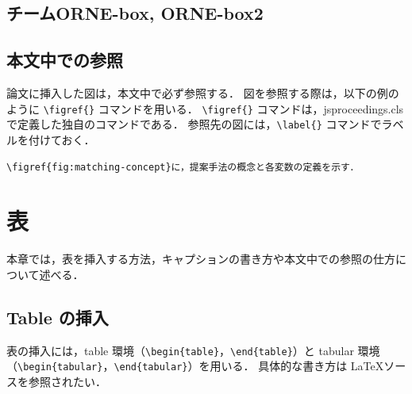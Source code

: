 \documentclass[uplatex, twocolumn, 9pt]{jsproceedings}
\begin{document}
\subsection{チームORNE-box, ORNE-box2}


\subsection{本文中での参照}
論文に挿入した図は，本文中で必ず参照する．
図を参照する際は，以下の例のように \verb*|\figref{}| コマンドを用いる．
\verb*|\figref{}| コマンドは，jsproceedings.cls で定義した独自のコマンドである．
参照先の図には，\verb*|\label{}| コマンドでラベルを付けておく．
\begin{description}[style=nextline]
  \item[\LaTeX ソース]%
  \verb|\figref{fig:matching-concept}に，提案手法の概念と各変数の定義を示す．|
  \item[出力]%
\end{description}


\section{表}
本章では，表を挿入する方法，キャプションの書き方や本文中での参照の仕方について述べる．

\subsection{Table の挿入}
表の挿入には，table 環境（\verb*|\begin{table}|，\verb*|\end{table}|）と tabular 環境（\verb*|\begin{tabular}|，\verb*|\end{tabular}|）を用いる．
具体的な書き方は \LaTeX ソースを参照されたい．

\end{document}
